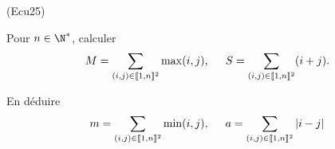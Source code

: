 \begin{tiny}(Ecu25)\end{tiny} Pour $n\in \N^*$, calculer
\begin{multline*}
 M = \sum_{(i,j)\in \llbracket 1, n\rrbracket^2}\max(i,j),\hspace{0.5cm}
 S = \sum_{(i,j)\in \llbracket 1, n\rrbracket^2}(i+j).
\end{multline*}

En déduire
\begin{displaymath}
 m = \sum_{(i,j)\in \llbracket 1, n\rrbracket^2}\min(i,j),\hspace{0.5cm} 
 a = \sum_{(i,j)\in \llbracket 1, n\rrbracket^2}|i - j|
\end{displaymath}
